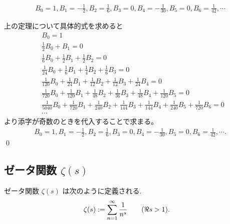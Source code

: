 \documentclass[uplatex,dvipdfmx,a4paper,11pt]{jlreq}
\makeatletter
\theoremstyle{definition}
\renewenvironment{proof}[1][\proofname]{\par
  \normalfont
  \topsep6\p@\@plus6\p@ \trivlist
  \item[\hskip\labelsep{\bfseries #1}\@addpunct{\bfseries}]\ignorespaces\quad\par
}{%
  \qed\endtrivlist\@endpefalse
}
\renewcommand\proofname{証明}
\makeatother
\begin{document}
\begin{proposition}
  \begin{align}
    B_0 = 1, B_1 = -\frac{1}{2}, B_2 = \frac{1}{6}, B_3 = 0, B_4 = -\frac{1}{30}, B_5 = 0, B_6 = \frac{1}{42}, \cdots
  \end{align}
\end{proposition}
\begin{proof}
  上の定理について具体的式を求めると
  \begin{align}
     & B_0 = 1                                                                                                                                 \\
     & \frac{1}{2}B_0 + B_1 = 0                                                                                                                \\
     & \frac{1}{6}B_0 + \frac{1}{2}B_1 + \frac{1}{2}B_2 = 0                                                                                    \\
     & \frac{1}{24}B_0 + \frac{1}{6}B_1 + \frac{1}{4}B_2 + \frac{1}{6}B_3 = 0                                                                  \\
     & \frac{1}{120}B_0 + \frac{1}{24}B_1 + \frac{1}{12}B_2 + \frac{1}{12}B_3 + \frac{1}{24}B_4 = 0                                            \\
     & \frac{1}{720}B_0 + \frac{1}{120}B_1 + \frac{1}{48}B_2 + \frac{1}{36}B_3 + \frac{1}{48}B_4 + \frac{1}{120}B_5 = 0                        \\
     & \frac{1}{5040}B_0 + \frac{1}{720}B_1 + \frac{1}{240}B_2 + \frac{1}{144}B_3 + \frac{1}{144}B_4 + \frac{1}{240}B_5 + \frac{1}{720}B_6 = 0 \\
     & \cdots
  \end{align}
  より添字が奇数のときを代入することで求まる。
  \begin{align}
    B_0 = 1, B_1 = -\frac{1}{2}, B_2 = \frac{1}{6}, B_3 = 0, B_4 = -\frac{1}{30}, B_5 = 0, B_6 = \frac{1}{42}, \cdots.
  \end{align}
\end{proof}



\subsection{ゼータ関数 $\zeta(s)$}
\begin{definition}[ゼータ関数]
  ゼータ関数 $\zeta(s)$ は次のように定義される.
  \begin{align}
    \zeta(s) & := \sum_{n=1}^{\infty}\frac{1}{n^s} \qquad (\real s > 1).
  \end{align}
\end{definition}
\end{document}
